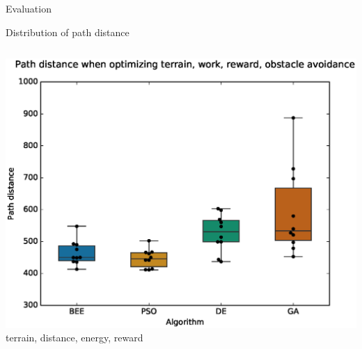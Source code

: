 \documentclass[9pt]{beamer}
\begin{document}
\begin{frame}{Evaluation}
\begin{block}{Distribution of path distance}
\begin{columns}
\begin{column}{0.5\textwidth}
\begin{center}
                    \includegraphics[width=\textwidth,trim={.75cm .75cm 0cm 1cm},clip]{img/EXP3_histo_distance_b.eps}
                    \linebreak
                    terrain, distance, energy, reward
                \end{center}
            \end{column}
        \end{columns}
    \end{block}
\end{frame}
\end{document}
